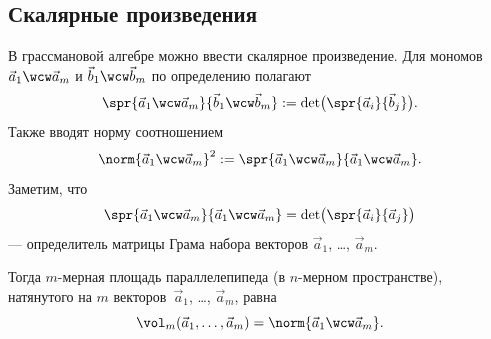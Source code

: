 




\subsection{Скалярные произведения}

В грассмановой алгебре можно ввести скалярное произведение. Для мономов
$
	\vec{a}_1 \wcw \vec{a}_m
$
и
$
	\vec{b}_1 \wcw \vec{b}_m
$
по определению полагают
\[
	\spr{
		\vec{a}_1 \wcw \vec{a}_m
	}{
		\vec{b}_1 \wcw \vec{b}_m
	}
	:=
	\det
	\bigl(
		\spr{\vec{a}_i}{\vec{b}_j}
	\bigr)
	.
\]
Также вводят норму соотношением
\[
	\norm{
		\vec{a}_1 \wcw \vec{a}_m
	}^2
	:=
	\spr{
		\vec{a}_1 \wcw \vec{a}_m
	}{
		\vec{a}_1 \wcw \vec{a}_m
	}
	.
\]
Заметим, что
\[
	\spr{
		\vec{a}_1 \wcw \vec{a}_m
	}{
		\vec{a}_1 \wcw \vec{a}_m
	}
	=
	\det
	\bigl(
		\spr{\vec{a}_i}{\vec{a}_j}
	\bigr)
\]
--- определитель матрицы Грама набора векторов $\vec{a}_1$, \dots, $\vec{a}_m$.

Тогда $m$-мерная площадь параллелепипеда (в $n$-мерном пространстве), натянутого на $m$ векторов~$\vec{a}_1$, \dots, $\vec{a}_m$, равна
\[
	\vol_m(\vec{a}_1, \dots, \vec{a}_m) =
	\norm{
		\vec{a}_1 \wcw \vec{a}_m
	}.
\]
